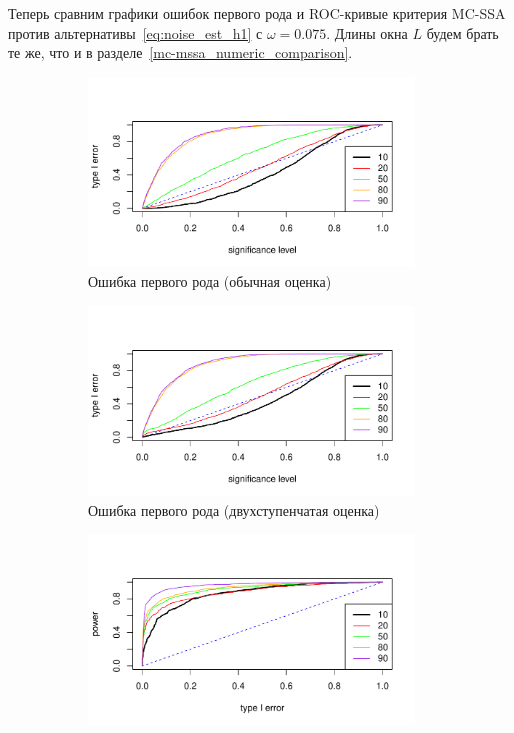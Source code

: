 \documentclass[specialist,
substylefile = spbu_report.rtx,
subf,href,colorlinks=true, 12pt]{disser}
\theoremstyle{definition}
\begin{document}
Теперь сравним графики ошибок первого рода и ROC-кривые критерия MC-SSA против альтернативы~\eqref{eq:noise_est_h1} с $\omega=0.075$. Длины окна $L$ будем брать те же, что и в разделе~\ref{mc-mssa_numeric_comparison}.

\begin{figure}[h!]
	\captionsetup[subfigure]{justification=Centering}
	\begin{subfigure}[t]{0.5\textwidth}
		\centering
		\includegraphics[width=0.95\textwidth]{img/type1error_arima.pdf}
		\caption{Ошибка первого рода (обычная оценка)}
		\label{fig:arima_type1error}
	\end{subfigure}\hspace{\fill}
	\begin{subfigure}[t]{0.5\textwidth}
		\centering
		\includegraphics[width=0.95\textwidth]{img/type1error_extract.pdf}
		\caption{Ошибка первого рода (двухступенчатая оценка)}
		\label{fig:extract_type1error}
	\end{subfigure}
	\bigskip
	\begin{subfigure}[t]{0.5\textwidth}
		\centering
		\includegraphics[width=0.95\textwidth]{img/roc_arima.pdf}

\end{subfigure}
\end{figure}
\end{document}
